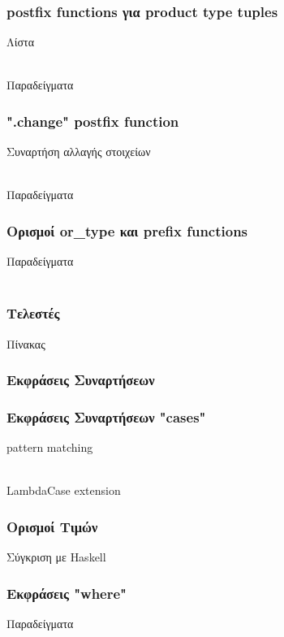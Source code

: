 \documentclass{beamer}
\def\e{\foreignlanguage{english}}
\def\h{\e{Haskell}}
\begin{document}
\begin{frame}

\frametitle{\e{postfix functions} για \e{product type tuples}}

Λίστα
\\~\

Παραδείγματα

\end{frame}

\begin{frame}

\frametitle{\e{".change" postfix function}}

Συναρτήση αλλαγής στοιχείων
\\~\

Παραδείγματα
\end{frame}

\begin{frame}

\frametitle{Ορισμοί \e{or\_type} και \e{prefix functions}}

Παραδείγματα
\\~\

\end{frame}

\begin{frame}

\frametitle{Τελεστές}

Πίνακας

\end{frame}

\begin{frame}

\frametitle{Εκφράσεις Συναρτήσεων}

\end{frame}

\begin{frame}

\frametitle{Εκφράσεις Συναρτήσεων \e{"cases"}}

\e{pattern matching}
\\~\

\e{LambdaCase extension}

\end{frame}

\begin{frame}

\frametitle{Ορισμοί Τιμών}

Σύγκριση με \h

\end{frame}

\begin{frame}

\frametitle{Εκφράσεις \e{"where"}}
Παραδείγματα

\end{frame}
\end{document}
